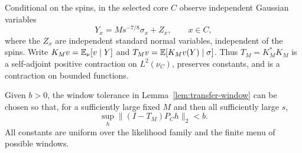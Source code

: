 Conditional on the spins, in the selected core $C$ observe independent
Gaussian variables
\begin{equation}
 Y_x=M s^{-7/8}\sigma_x+Z_x,\qquad x\in C,
 \label{eq:transfer-observations}
\end{equation}
where the $Z_x$ are independent standard normal variables, independent
of the spins.
Write $K_Mv=\mathbb E_\nu[v\mid Y]$ and
$T_Mv=\mathbb E[K_Mv(Y)\mid\sigma]$.  Thus $T_M=K_M^*K_M$ is a
self-adjoint positive contraction on $L^2(\nu_C)$, preserves constants,
and is a contraction on bounded functions.

\begin{lemma}
\label{lem:transfer-smoothing}
Given $b>0$, the window tolerance in Lemma~\ref{lem:transfer-window}
can be chosen so that, for a sufficiently large fixed $M$ and then all
sufficiently large $s$,
\begin{equation}
 \sup_h\|(I-T_M)P_Ch\|_2<b.
 \label{eq:transfer-smoothing}
\end{equation}
All constants are uniform over the likelihood family and the finite menu
of possible windows.
\end{lemma}


